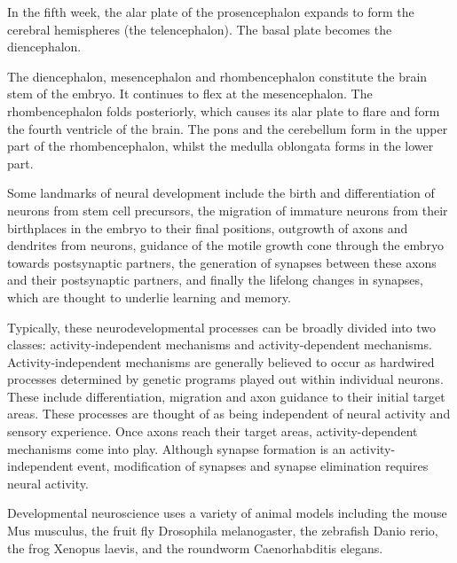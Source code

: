 \documentclass[]{book}
\begin{document}
In the fifth week, the alar plate of the prosencephalon expands to form the cerebral hemispheres (the telencephalon). The basal plate becomes the diencephalon.

The diencephalon, mesencephalon and rhombencephalon constitute the brain stem of the embryo. It continues to flex at the mesencephalon. The rhombencephalon folds posteriorly, which causes its alar plate to flare and form the fourth ventricle of the brain. The pons and the cerebellum form in the upper part of the rhombencephalon, whilst the medulla oblongata forms in the lower part.

Some landmarks of neural development include the birth and differentiation of neurons from stem cell precursors, the migration of immature neurons from their birthplaces in the embryo to their final positions, outgrowth of axons and dendrites from neurons, guidance of the motile growth cone through the embryo towards postsynaptic partners, the generation of synapses between these axons and their postsynaptic partners, and finally the lifelong changes in synapses, which are thought to underlie learning and memory.

Typically, these neurodevelopmental processes can be broadly divided into two classes: activity-independent mechanisms and activity-dependent mechanisms. Activity-independent mechanisms are generally believed to occur as hardwired processes determined by genetic programs played out within individual neurons. These include differentiation, migration and axon guidance to their initial target areas. These processes are thought of as being independent of neural activity and sensory experience. Once axons reach their target areas, activity-dependent mechanisms come into play. Although synapse formation is an activity-independent event, modification of synapses and synapse elimination requires neural activity.

Developmental neuroscience uses a variety of animal models including the mouse Mus musculus, the fruit fly Drosophila melanogaster, the zebrafish Danio rerio, the frog Xenopus laevis, and the roundworm Caenorhabditis elegans.
\end{document}
